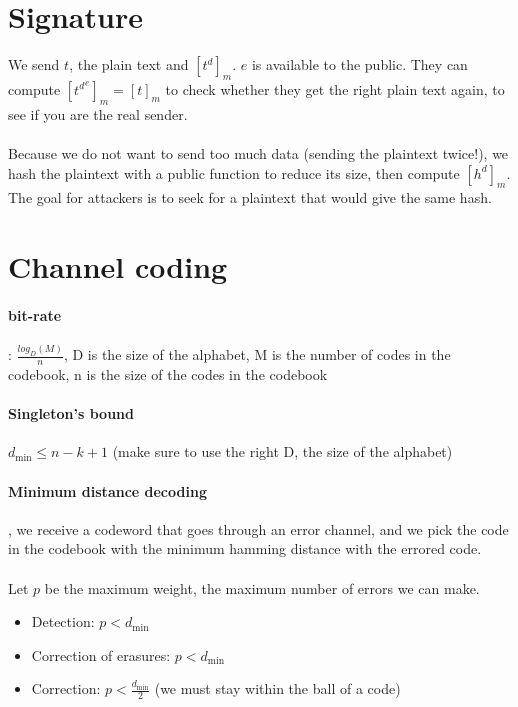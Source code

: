 \documentclass{article}
\begin{document}
\newpage

\section{Signature}

We send $t$, the plain text and $[t^d]_m$. $e$ is available to the public. They can compute $[{t^d}^e]_m = [t]_m$ to check whether they get the right plain text again, to see if you are the real sender.\\\\
Because we do not want to send too much data (sending the plaintext twice!), we hash the plaintext with a public function to reduce its size, then compute $[h^d]_m$. The goal for attackers is to seek for a plaintext that would give the same hash.

\newpage

\section{Channel coding}

\paragraph{bit-rate}: $\frac{log_D(M)}{n}$, D is the size of the alphabet, M is the number of codes in the codebook, n is the size of the codes in the codebook
\paragraph{Singleton's bound} $d_{\text{min}} \leq n - k + 1$ (make sure to use the right D, the size of the alphabet)

\paragraph{Minimum distance decoding}, we receive a codeword that goes through an error channel, and we pick the code in the codebook with the minimum hamming distance with the errored code.\\\\
Let \( p \) be the maximum weight, the maximum number of errors we can make.

\begin{itemize}
    \item Detection: \( p < d_{\text{min}} \)
    \item Correction of erasures: \( p < d_{\text{min}} \)
    \item Correction: \( p < \frac{d_{\text{min}}}{2} \) (we must stay within the ball of a code)
\end{itemize}
\end{document}
